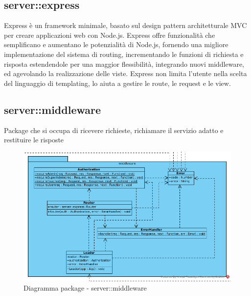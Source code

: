 \subsection{server::express}
Express è un framework minimale, basato sul design pattern architetturale MVC per creare applicazioni web con Node.js. Express offre funzionalità che semplificano e aumentano le potenzialità di Node.js, fornendo una migliore implementazione del sistema di routing, incrementando
le funzioni di richiesta e risposta estendendole per una maggior flessibilità, integrando nuovi middleware, ed agevolando la realizzazione delle viste.
Express non limita l’utente nella scelta del linguaggio di templating, lo aiuta a gestire le route, le request e le view.\subsection{server::middleware}
Package che si occupa di ricevere richieste, richiamare il servizio adatto e restituire le risposte\begin{center}
		\begin{figure}[H]
			\centering \includegraphics[scale=4, max width=\textwidth, max height=\myheight]{../img/diagrammiClassi/server/middleware.png}
			\caption{Diagramma package - server::middleware}
		\end{figure}
	\end{center}\hypertarget{server::middleware::Router}{}
